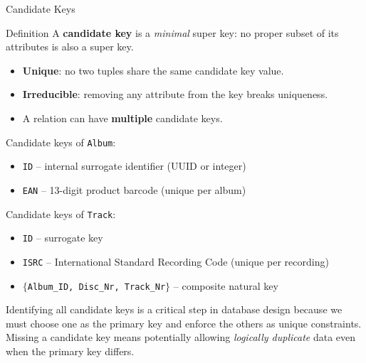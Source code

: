 \begin{frame}{Candidate Keys}
  \begin{block}{Definition}
    A \textbf{candidate key} is a \emph{minimal} super key: no proper
    subset of its attributes is also a super key.
    \begin{itemize}
      \item \textbf{Unique}: no two tuples share the same candidate key value.
      \item \textbf{Irreducible}: removing any attribute from the key breaks
            uniqueness.
      \item A relation can have \textbf{multiple} candidate keys.
    \end{itemize}
  \end{block}

  \begin{examples}{}
    Candidate keys of \texttt{Album}:
    \begin{itemize}
      \item \texttt{ID} -- internal surrogate identifier (UUID or integer)
      \item \texttt{EAN} -- 13-digit product barcode (unique per album)
    \end{itemize}
    Candidate keys of \texttt{Track}:
    \begin{itemize}
      \item \texttt{ID} -- surrogate key
      \item \texttt{ISRC} -- International Standard Recording Code (unique per recording)
      \item $\{$\texttt{Album\_ID, Disc\_Nr, Track\_Nr}$\}$ -- composite natural key
    \end{itemize}
  \end{examples}

  Identifying all candidate keys is a critical step in database design because
  we must choose one as the primary key and enforce the others as unique
  constraints.  Missing a candidate key means potentially allowing
  \emph{logically duplicate} data even when the primary key differs.
\end{frame}

